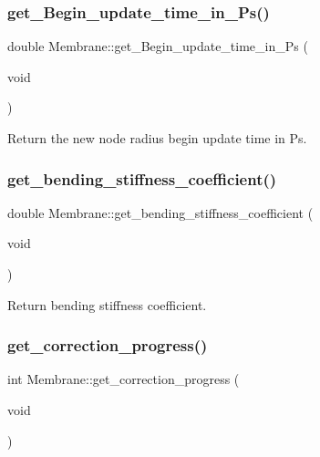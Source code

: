 \subsubsection{\texorpdfstring{get\_Begin\_update\_time\_in\_Ps()}{get\_Begin\_update\_time\_in\_Ps()}}
{\footnotesize\ttfamily double Membrane\+::get\+\_\+\+Begin\+\_\+update\+\_\+time\+\_\+in\+\_\+\+Ps (\begin{DoxyParamCaption}\item[{void}]{ }\end{DoxyParamCaption})\hspace{0.3cm}{\ttfamily [inline]}}

Return the new node radius \textquotesingle{}begin update time\textquotesingle{} in Ps. \mbox{\label{classMembrane_ae1e3082fdde5dbef11fb6c3b7cc97c0a}} 
\subsubsection{\texorpdfstring{get\_bending\_stiffness\_coefficient()}{get\_bending\_stiffness\_coefficient()}}
{\footnotesize\ttfamily double Membrane\+::get\+\_\+bending\+\_\+stiffness\+\_\+coefficient (\begin{DoxyParamCaption}\item[{void}]{ }\end{DoxyParamCaption})\hspace{0.3cm}{\ttfamily [inline]}}

Return bending stiffness coefficient. \mbox{\label{classMembrane_ad3960f87e60282211a1266f4d3318dc0}} 
\subsubsection{\texorpdfstring{get\_correction\_progress()}{get\_correction\_progress()}}
{\footnotesize\ttfamily int Membrane\+::get\+\_\+correction\+\_\+progress (\begin{DoxyParamCaption}\item[{void}]{ }\end{DoxyParamCaption})\hspace{0.3cm}{\ttfamily [inline]}}

